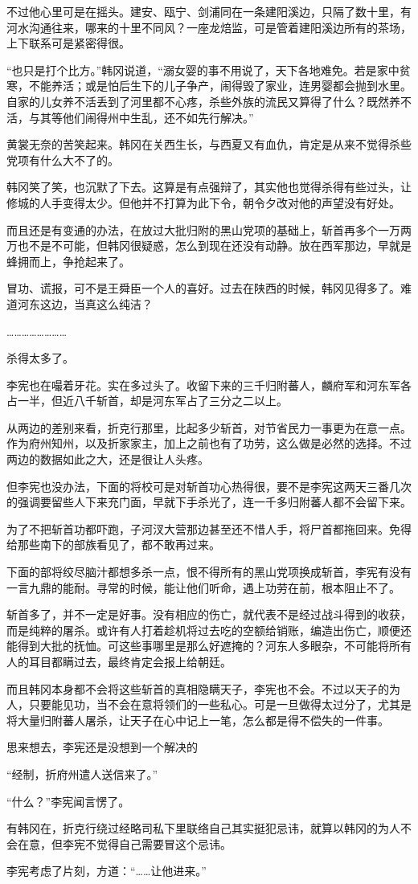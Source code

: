 不过他心里可是在摇头。建安、瓯宁、剑浦同在一条建阳溪边，只隔了数十里，有河水沟通往来，哪来的十里不同风？一座龙焙监，可是管着建阳溪边所有的茶场，上下联系可是紧密得很。

“也只是打个比方。”韩冈说道，“溺女婴的事不用说了，天下各地难免。若是家中贫寒，不能养活；或是怕后生下的儿子争产，闹得毁了家业，连男婴都会抛到水里。自家的儿女养不活丢到了河里都不心疼，杀些外族的流民又算得了什么？既然养不活，与其等他们闹得州中生乱，还不如先行解决。”

黄裳无奈的苦笑起来。韩冈在关西生长，与西夏又有血仇，肯定是从来不觉得杀些党项有什么大不了的。

韩冈笑了笑，也沉默了下去。这算是有点强辩了，其实他也觉得杀得有些过头，让修城的人手变得太少。但他并不打算为此下令，朝令夕改对他的声望没有好处。

而且还是有变通的办法，在放过大批归附的黑山党项的基础上，斩首再多个一万两万也不是不可能，但韩冈很疑惑，怎么到现在还没有动静。放在西军那边，早就是蜂拥而上，争抢起来了。

冒功、谎报，可不是王舜臣一个人的喜好。过去在陕西的时候，韩冈见得多了。难道河东这边，当真这么纯洁？

……………………

杀得太多了。

李宪也在嘬着牙花。实在多过头了。收留下来的三千归附蕃人，麟府军和河东军各占一半，但近八千斩首，却是河东军占了三分之二以上。

从两边的差别来看，折克行那里，比起多少斩首，对节省民力一事更为在意一点。作为府州知州，以及折家家主，加上之前也有了功劳，这么做是必然的选择。不过两边的数据如此之大，还是很让人头疼。

但李宪也没办法，下面的将校可是对斩首功心热得很，要不是李宪这两天三番几次的强调要留些人下来充门面，早就下手杀光了，连一千多归附蕃人都不会留下来。

为了不把斩首功都吓跑，子河汊大营那边甚至还不惜人手，将尸首都拖回来。免得给那些南下的部族看见了，都不敢再过来。

下面的部将绞尽脑汁都想多杀一点，恨不得所有的黑山党项换成斩首，李宪有没有一言九鼎的能耐。寻常的时候，能让他们听命，遇上功劳在前，根本阻止不了。

斩首多了，并不一定是好事。没有相应的伤亡，就代表不是经过战斗得到的收获，而是纯粹的屠杀。或许有人打着趁机将过去吃的空额给销账，编造出伤亡，顺便还能得到大批的抚恤。可这些事哪里是那么好遮掩的？河东人多眼杂，不可能将所有人的耳目都瞒过去，最终肯定会报上给朝廷。

而且韩冈本身都不会将这些斩首的真相隐瞒天子，李宪也不会。不过以天子的为人，只要能见功，当不会在意将领们的一些私心。可是一旦做得太过分了，尤其是将大量归附蕃人屠杀，让天子在心中记上一笔，怎么都是得不偿失的一件事。

思来想去，李宪还是没想到一个解决的

“经制，折府州遣人送信来了。”

“什么？”李宪闻言愣了。

有韩冈在，折克行绕过经略司私下里联络自己其实挺犯忌讳，就算以韩冈的为人不会在意，但李宪不觉得自己需要冒这个忌讳。

李宪考虑了片刻，方道：“……让他进来。”

